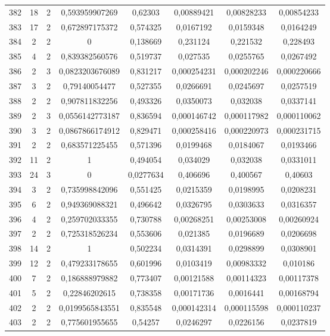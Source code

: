 \begin{longtable}{|c|c|c|c|c|c|c|c|}
382 & 18 & 2 & 0,593959907269 & 0,62303 & 0,00889421 & 0,00828233 & 0,00854233  \\
383 & 17 & 2 & 0,672897175372 & 0,574325 & 0,0167192 & 0,0159348 & 0,0164249  \\
384 & 2 & 2 & 0 & 0,138669 & 0,231124 & 0,221532 & 0,228493  \\
385 & 4 & 2 & 0,839382560576 & 0,519737 & 0,027535 & 0,0255765 & 0,0267492  \\
386 & 2 & 3 & 0,0823203676089 & 0,831217 & 0,000254231 & 0,000202246 & 0,000220666  \\
387 & 3 & 2 & 0,79140054477 & 0,527355 & 0,0266691 & 0,0245697 & 0,0257519  \\
388 & 2 & 2 & 0,907811832256 & 0,493326 & 0,0350073 & 0,032038 & 0,0337141  \\
389 & 2 & 3 & 0,0556142773187 & 0,836594 & 0,000146742 & 0,000117982 & 0,000110062  \\
390 & 3 & 2 & 0,0867866174912 & 0,829471 & 0,000258416 & 0,000220973 & 0,000231715  \\
391 & 2 & 2 & 0,683571225455 & 0,571396 & 0,0199468 & 0,0184067 & 0,0193466  \\
392 & 11 & 2 & 1 & 0,494054 & 0,034029 & 0,032038 & 0,0331011  \\
393 & 24 & 3 & 0 & 0,0277634 & 0,406696 & 0,400567 & 0,40603  \\
394 & 3 & 2 & 0,735998842096 & 0,551425 & 0,0215359 & 0,0198995 & 0,0208231  \\
395 & 6 & 2 & 0,949369088321 & 0,496642 & 0,0326795 & 0,0303633 & 0,0316357  \\
396 & 4 & 2 & 0,259702033355 & 0,730788 & 0,00268251 & 0,00253008 & 0,00260924  \\
397 & 2 & 2 & 0,725318526234 & 0,553606 & 0,021385 & 0,0196689 & 0,0206698  \\
398 & 14 & 2 & 1 & 0,502234 & 0,0314391 & 0,0298899 & 0,0308901  \\
399 & 12 & 2 & 0,479233178655 & 0,601996 & 0,0103419 & 0,00983332 & 0,010186  \\
400 & 7 & 2 & 0,186888979882 & 0,773407 & 0,00121588 & 0,00114323 & 0,00117378  \\
401 & 5 & 2 & 0,22846202615 & 0,738358 & 0,00171736 & 0,0016441 & 0,00168794  \\
402 & 2 & 2 & 0,0199565843551 & 0,835548 & 0,000142314 & 0,000115598 & 0,000110237  \\
403 & 2 & 2 & 0,775601955655 & 0,54257 & 0,0246297 & 0,0226156 & 0,0237819  \\

\end{longtable}
